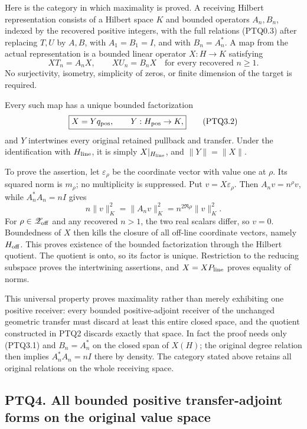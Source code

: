 Here is the category in which maximality is proved. A receiving Hilbert
representation consists of a Hilbert space \(K\) and bounded operators
\(A_n,B_n\), indexed by the recovered positive integers, with the full
relations (PTQ0.3) after replacing \(T,U\) by \(A,B\), with
\(A_1=B_1=I\), and with \(B_n=A_n^*\). A map from the actual
representation is a bounded linear operator \(X:H\to K\) satisfying \[
XT_n=A_nX,\qquad XU_n=B_nX
\quad\text{for every recovered }n\ge1.
\tag{PTQ3.1}
\] No surjectivity, isometry, simplicity of zeros, or finite dimension
of the target is required.

Every such map has a unique bounded factorization \[
\boxed{X=Yq_{\rm pos},\qquad
Y:H_{\rm pos}\to K,}
\tag{PTQ3.2}
\] and \(Y\) intertwines every original retained pullback and transfer.
Under the identification with \(H_{\rm line}\), it is simply
\(X|_{H_{\rm line}}\), and \(\|Y\|=\|X\|\).

To prove the assertion, let \(\varepsilon_\rho\) be the coordinate
vector with value one at \(\rho\). Its squared norm is \(m_\rho\); no
multiplicity is suppressed. Put \(v=X\varepsilon_\rho\). Then
\(A_nv=n^\rho v\), while \(A_n^*A_n=nI\) gives \[
n\|v\|_K^2=\|A_nv\|_K^2=n^{2\Re\rho}\|v\|_K^2.
\tag{PTQ3.3}
\] For \(\rho\in\mathscr Z_{\rm off}\) and any recovered \(n>1\), the
two real scalars differ, so \(v=0\). Boundedness of \(X\) then kills the
closure of all off-line coordinate vectors, namely \(H_{\rm off}\). This
proves existence of the bounded factorization through the Hilbert
quotient. The quotient is onto, so its factor is unique. Restriction to
the reducing subspace proves the intertwining assertions, and
\(X=XP_{\rm line}\) proves equality of norms.

This universal property proves maximality rather than merely exhibiting
one positive receiver: every bounded positive-adjoint receiver of the
unchanged geometric transfer must discard at least this entire closed
space, and the quotient constructed in PTQ2 discards exactly that space.
In fact the proof needs only (PTQ3.1) and \(B_n=A_n^*\) on the closed
span of \(X(H)\); the original degree relation then implies
\(A_n^*A_n=nI\) there by density. The category stated above retains all
original relations on the whole receiving space.

\subsection{PTQ4. All bounded positive transfer-adjoint forms on the
original value
space}\label{ptq4.-all-bounded-positive-transfer-adjoint-forms-on-the-original-value-space}

